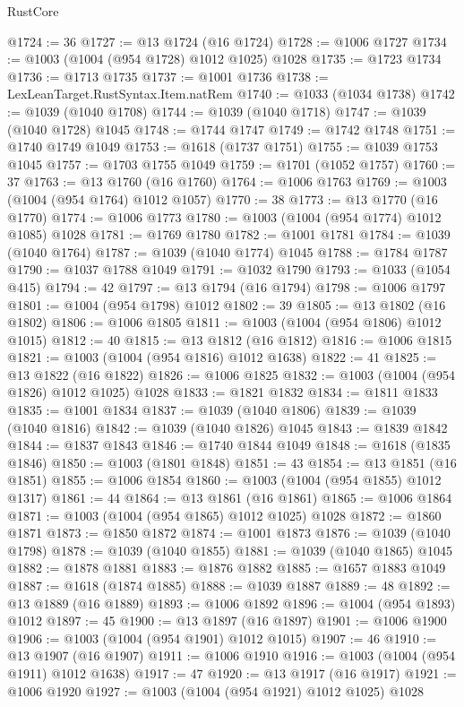 \begin{lexlean}{RustCore}
\begin{coremodule}
@1724 := 36
@1727 := @13 @1724 (@16 @1724)
@1728 := @1006 @1727
@1734 := @1003 (@1004 (@954 @1728) @1012 @1025) @1028
@1735 := @1723 @1734
@1736 := @1713 @1735
@1737 := @1001 @1736
@1738 := LexLeanTarget.RustSyntax.Item.natRem
@1740 := @1033 (@1034 @1738)
@1742 := @1039 (@1040 @1708)
@1744 := @1039 (@1040 @1718)
@1747 := @1039 (@1040 @1728) @1045
@1748 := @1744 @1747
@1749 := @1742 @1748
@1751 := @1740 @1749 @1049
@1753 := @1618 (@1737 @1751)
@1755 := @1039 @1753 @1045
@1757 := @1703 @1755 @1049
@1759 := @1701 (@1052 @1757)
@1760 := 37
@1763 := @13 @1760 (@16 @1760)
@1764 := @1006 @1763
@1769 := @1003 (@1004 (@954 @1764) @1012 @1057)
@1770 := 38
@1773 := @13 @1770 (@16 @1770)
@1774 := @1006 @1773
@1780 := @1003 (@1004 (@954 @1774) @1012 @1085) @1028
@1781 := @1769 @1780
@1782 := @1001 @1781
@1784 := @1039 (@1040 @1764)
@1787 := @1039 (@1040 @1774) @1045
@1788 := @1784 @1787
@1790 := @1037 @1788 @1049
@1791 := @1032 @1790
@1793 := @1033 (@1054 @415)
@1794 := 42
@1797 := @13 @1794 (@16 @1794)
@1798 := @1006 @1797
@1801 := @1004 (@954 @1798) @1012
@1802 := 39
@1805 := @13 @1802 (@16 @1802)
@1806 := @1006 @1805
@1811 := @1003 (@1004 (@954 @1806) @1012 @1015)
@1812 := 40
@1815 := @13 @1812 (@16 @1812)
@1816 := @1006 @1815
@1821 := @1003 (@1004 (@954 @1816) @1012 @1638)
@1822 := 41
@1825 := @13 @1822 (@16 @1822)
@1826 := @1006 @1825
@1832 := @1003 (@1004 (@954 @1826) @1012 @1025) @1028
@1833 := @1821 @1832
@1834 := @1811 @1833
@1835 := @1001 @1834
@1837 := @1039 (@1040 @1806)
@1839 := @1039 (@1040 @1816)
@1842 := @1039 (@1040 @1826) @1045
@1843 := @1839 @1842
@1844 := @1837 @1843
@1846 := @1740 @1844 @1049
@1848 := @1618 (@1835 @1846)
@1850 := @1003 (@1801 @1848)
@1851 := 43
@1854 := @13 @1851 (@16 @1851)
@1855 := @1006 @1854
@1860 := @1003 (@1004 (@954 @1855) @1012 @1317)
@1861 := 44
@1864 := @13 @1861 (@16 @1861)
@1865 := @1006 @1864
@1871 := @1003 (@1004 (@954 @1865) @1012 @1025) @1028
@1872 := @1860 @1871
@1873 := @1850 @1872
@1874 := @1001 @1873
@1876 := @1039 (@1040 @1798)
@1878 := @1039 (@1040 @1855)
@1881 := @1039 (@1040 @1865) @1045
@1882 := @1878 @1881
@1883 := @1876 @1882
@1885 := @1657 @1883 @1049
@1887 := @1618 (@1874 @1885)
@1888 := @1039 @1887
@1889 := 48
@1892 := @13 @1889 (@16 @1889)
@1893 := @1006 @1892
@1896 := @1004 (@954 @1893) @1012
@1897 := 45
@1900 := @13 @1897 (@16 @1897)
@1901 := @1006 @1900
@1906 := @1003 (@1004 (@954 @1901) @1012 @1015)
@1907 := 46
@1910 := @13 @1907 (@16 @1907)
@1911 := @1006 @1910
@1916 := @1003 (@1004 (@954 @1911) @1012 @1638)
@1917 := 47
@1920 := @13 @1917 (@16 @1917)
@1921 := @1006 @1920
@1927 := @1003 (@1004 (@954 @1921) @1012 @1025) @1028

\end{coremodule}
\end{lexlean}
